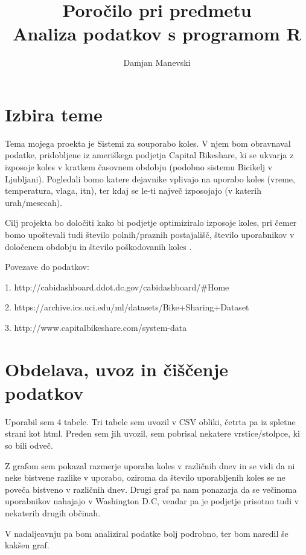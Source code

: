 \documentclass[11pt,a4paper]{article}
\begin{document}
\title{Poročilo pri predmetu \\
Analiza podatkov s programom R}
\author{Damjan Manevski}
\maketitle

\section{Izbira teme}

  Tema mojega proekta je  Sistemi za souporabo koles. V njem bom obravnaval podatke, pridobljene iz ameriškega podjetja Capital Bikeshare, ki se ukvarja z izposoje koles v kratkem časovnem obdobju (podobno sistemu Bicikelj v Ljubljani). Pogledali bomo katere dejavnike vplivajo na uporabo koles (vreme, temperatura, vlaga, itn), ter kdaj se le-ti največ izposojajo (v katerih urah/mesecah).
  
  Cilj projekta bo določiti kako bi podjetje optimiziralo izposoje koles, pri čemer bomo upoštevali tudi število polnih/praznih postajališč, število uporabnikov v določenem obdobju in število poškodovanih koles .
  
  Povezave do podatkov:
  
1.  http://cabidashboard.ddot.dc.gov/cabidashboard/#Home

2.	https://archive.ics.uci.edu/ml/datasets/Bike+Sharing+Dataset

3.	http://www.capitalbikeshare.com/system-data


\section{Obdelava, uvoz in čiščenje podatkov}

Uporabil sem 4 tabele. Tri tabele sem uvozil v CSV obliki, četrta pa iz spletne strani kot html. Preden sem jih uvozil, sem pobrisal nekatere vrstice/stolpce, ki so bili odveč.

Z grafom sem pokazal razmerje uporaba koles v različnih dnev in se vidi da ni neke bistvene razlike v uporabo, oziroma da število uporabljenih koles se ne poveča bistveno v različnih dnev. Drugi graf pa nam ponazarja da se večinoma uporabnikov nahajajo v Washington D.C, vendar pa je podjetje prisotno tudi v nekaterih drugih občinah.

V nadaljeavnju pa bom analiziral podatke bolj podrobno, ter bom naredil še kakšen graf.


% 
% 
% 
\end{document}

